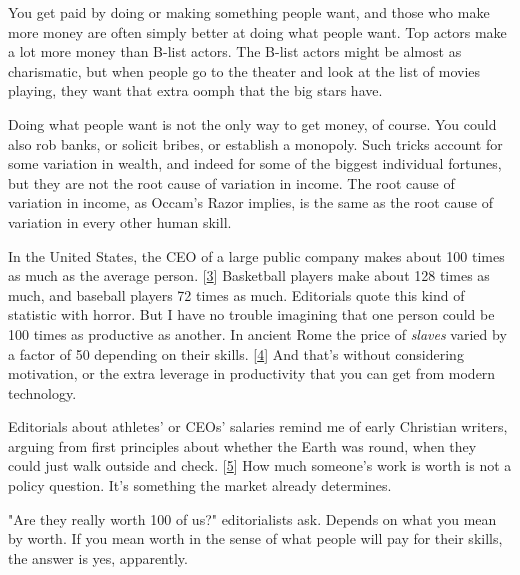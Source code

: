 You
                  get paid by doing or making something people want, and those
                  who make more money are often simply better at doing what
                  people want. Top actors make a lot more money than B-list
                  actors. The B-list actors might be almost as charismatic, but
                  when people go to the theater and look at the list of movies
                  playing, they want that extra oomph that the big stars
                  have.

Doing what people want is not the only way to
                  get money, of course. You could also rob banks, or solicit
                  bribes, or establish a monopoly. Such tricks account for some
                  variation in wealth, and indeed for some of the biggest
                  individual fortunes, but they are not the root cause of
                  variation in income. The root cause of variation in income, as
                  Occam's Razor implies, is the same as the root cause of
                  variation in every other human skill.

In the United
                  States, the CEO of a large public company makes about 100
                  times as much as the average person.
                  [\href{\#f3n}{3}]
                  Basketball players make about 128 times as much, and baseball
                  players 72 times as much. Editorials quote this kind of
                  statistic with horror. But I have no trouble imagining that
                  one person could be 100 times as productive as another. In
                  ancient Rome the price of \emph{slaves} varied by a factor of
                  50 depending on their skills.
                  [\href{\#f4n}{4}]
                  And that's without considering motivation, or the extra
                  leverage in productivity that you can get from modern
                  technology.

Editorials about athletes' or CEOs'
                  salaries remind me of early Christian writers, arguing from
                  first principles about whether the Earth was round, when they
                  could just walk outside and check.
                  [\href{\#f5n}{5}]
                  How much someone's work is worth is not a policy question.
                  It's something the market already determines.

"Are
                  they really worth 100 of us?" editorialists ask. Depends on
                  what you mean by worth. If you mean worth in the sense of what
                  people will pay for their skills, the answer is yes,
                  apparently.

